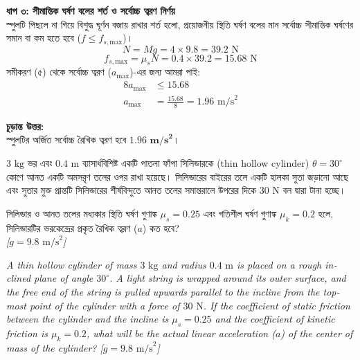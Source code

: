\documentclass[12pt, a4paper]{article}
\begin{document}
\begin{tcolorbox}[solutionbox={সমাধান (Solution)}]
\vspace{0.5em}
\noindent
\textbf{ধাপ ৩: সীমান্তিক ঘর্ষণ বলের শর্ত ও সর্বোচ্চ ত্বরণ নির্ণয়} \\
স্পুলটি পিছলে না গিয়ে বিশুদ্ধ ঘূর্ণন বজায় রাখার শর্ত হলো, প্রয়োজনীয় স্থিতি ঘর্ষণ বলের মান সর্বোচ্চ সীমান্তিক ঘর্ষণের সমান বা কম হতে হবে ($f \le f_{s,\text{max}}$)।
\[ N = M g = 4 \times 9.8 = 39.2\text{ N} \]
\[ f_{s,\text{max}} = \mu_s N = 0.4 \times 39.2 = 15.68\text{ N} \]
সমীকরণ (৫) থেকে সর্বোচ্চ ত্বরণ ($a_{\text{max}}$)-এর জন্য আমরা পাই:
\begin{align*}
    8 a_{\text{max}} &\le 15.68 \\
    a_{\text{max}} &= \frac{15.68}{8} = 1.96\text{ m/s}^2
\end{align*}

\vspace{1em}
\begin{tcolorbox}[answerbox]
\textbf{চূড়ান্ত উত্তর:} \\
স্পুলটির অর্জিত সর্বোচ্চ রৈখিক ত্বরণ হবে $\mathbf{1.96 \text{ m/s}^2}$।
\end{tcolorbox}
\end{tcolorbox}
\begin{tcolorbox}[questionbox={প্রশ্ন (Question) 10}]
\noindent
$3\text{ kg}$ ভর এবং $0.4\text{ m}$ ব্যাসার্ধবিশিষ্ট একটি পাতলা ফাঁপা সিলিন্ডারকে (thin hollow cylinder) $\theta = 30^\circ$ কোণে আনত একটি অমসরৃণ তলের ওপর রাখা হয়েছে। সিলিন্ডারের বাইরের তলে একটি হালকা সুতা জড়ানো আছে এবং সুতার মুক্ত প্রান্তটি সিলিন্ডারের শীর্ষবিন্দুতে আনত তলের সমান্তরালে উপরের দিকে $30\text{ N}$ বল দ্বারা টানা হচ্ছে। 

\vspace{0.3em}
\noindent
সিলিন্ডার ও আনত তলের মধ্যকার স্থিতি ঘর্ষণ গুণাঙ্ক $\mu_s = 0.25$ এবং গতিশীল ঘর্ষণ গুণাঙ্ক $\mu_k = 0.2$ হলে, সিলিন্ডারটির ভরকেন্দ্রের প্রকৃত রৈখিক ত্বরণ ($a$) কত হবে? \\
\textit{[$g = 9.8\text{ m/s}^2$]}

\vspace{0.8em}
\begin{english}
\noindent\textit{\color{darkgray}
A thin hollow cylinder of mass $3\text{ kg}$ and radius $0.4\text{ m}$ is placed on a rough inclined plane of angle $30^\circ$. A light string is wrapped around its outer surface, and the free end of the string is pulled upwards parallel to the incline from the topmost point of the cylinder with a force of $30\text{ N}$. If the coefficient of static friction between the cylinder and the incline is $\mu_s = 0.25$ and the coefficient of kinetic friction is $\mu_k = 0.2$, what will be the actual linear acceleration ($a$) of the center of mass of the cylinder? [$g = 9.8\text{ m/s}^2$]
}
\end{english}
\end{tcolorbox}
\end{document}
